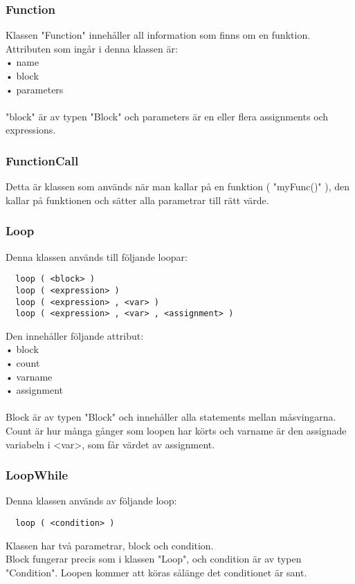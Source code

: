 \documentclass{TDP003mall}
\begin{document}
\subsubsection{Function}
Klassen "Function" innehåller all information som finns om en funktion. Attributen som ingår i denna klassen är: \\
 • name\\
 • block\\
 • parameters\\
\\
"block" är av typen "Block" och parameters är en eller flera assignments och expressions.

\subsubsection{FunctionCall}
Detta är klassen som används när man kallar på en funktion ( "myFunc()" ), den kallar på funktionen och sätter alla parametrar till rätt värde.

\subsubsection{Loop}
Denna klassen används till följande loopar:
\begin{lstlisting}
  loop ( <block> )
  loop ( <expression> )
  loop ( <expression> , <var> )
  loop ( <expression> , <var> , <assignment> )
\end{lstlisting}
Den innehåller följande attribut:\\
 • block\\
 • count\\
 • varname\\
 • assignment\\
\\
Block är av typen "Block" och innehåller alla statements mellan måsvingarna. Count är hur många gånger som loopen har körts och varname är den assignade variabeln i <var>, som får värdet av assignment.

\subsubsection{LoopWhile}
Denna klassen används av följande loop:
\begin{lstlisting}
  loop ( <condition> )
\end{lstlisting}
Klassen har två parametrar, block och condition.\\
Block fungerar precis som i klassen "Loop", och condition är av typen "Condition". Loopen kommer att köras sålänge det conditionet är sant.
\end{document}
